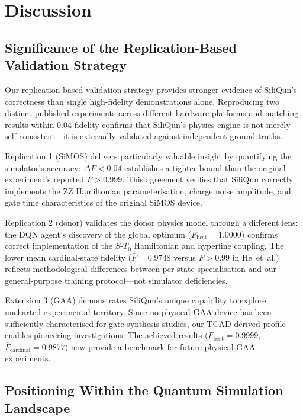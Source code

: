 \section{Discussion}
\label{sec:discussion}

\subsection{Significance of the Replication-Based Validation Strategy}
\label{subsec:significance}

Our replication-based validation strategy provides stronger evidence of SiliQun's correctness than single high-fidelity demonstrations alone. Reproducing two distinct published experiments across different hardware platforms and matching results within $0.04$ fidelity confirms that SiliQun's physics engine is not merely self-consistent—it is externally validated against independent ground truths.

Replication 1 (SiMOS) delivers particularly valuable insight by quantifying the simulator's accuracy: $\Delta F < 0.04$ establishes a tighter bound than the original experiment's reported $F > 0.999$. This agreement verifies that SiliQun correctly implements the ZZ Hamiltonian parameterisation, charge noise amplitude, and gate time characteristics of the original SiMOS device. 

Replication 2 (donor) validates the donor physics model through a different lens: the DQN agent's discovery of the global optimum ($F_\text{best} = 1.0000$) confirms correct implementation of the $S$-$T_0$ Hamiltonian and hyperfine coupling. The lower mean cardinal-state fidelity ($\bar{F} = 0.9748$ versus $F > 0.99$ in He~et~al.) reflects methodological differences between per-state specialisation and our general-purpose training protocol—not simulator deficiencies.

Extension 3 (GAA) demonstrates SiliQun's unique capability to explore uncharted experimental territory. Since no physical GAA device has been sufficiently characterised for gate synthesis studies, our TCAD-derived profile~\cite{Tanamoto2025} enables pioneering investigations. The achieved results ($F_\text{best} = 0.9999$, $\bar{F}_\text{cardinal} = 0.9877$) now provide a benchmark for future physical GAA experiments.

\subsection{Positioning Within the Quantum Simulation Landscape}
\label{subsec:positioning}

